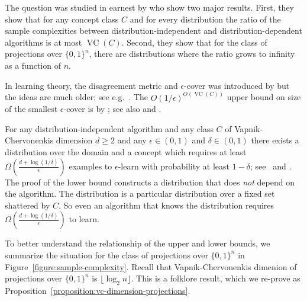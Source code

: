 \documentclass[10pt]{article}
\DeclareMathOperator{\VC}{VC}
\begin{document}
The question was studied in earnest by \cite{Darnstadt-Simon-Szorenyi-2013} who
show two major results. First, they show that for any concept class $C$ and for
every distribution the ratio of the sample complexities between
distribution-independent and distribution-dependent algorithms is at most
$\VC(C)$. Second, they show that for the class of projections over $\{0,1\}^n$,
there are distributions where the ratio grows to infinity as a function of $n$.

In learning theory, the disagreement metric and $\epsilon$-cover was  introduced
by \cite{Benedek-Itai-1991} but the ideas are much older; see
e.g.~\cite{Dudley-1978, Dudley-1984}. The $O(1/\epsilon)^{O(\VC(C))}$ upper
bound on size of the smallest $\epsilon$-cover is by \citet[Lemma
7.13]{Dudley-1978}; see also \citet[Chapter 4]{Devroye-Lugosi-2000} and
\cite{Haussler-1995}.

For any distribution-independent algorithm and any class $C$ of
Vapnik-Chervonenkis dimension $d \ge 2$ and any $\epsilon \in (0,1)$ and $\delta
\in (0,1)$ there exists a distribution over the domain and a concept which
requires at least $\Omega \left(\frac{d + \log(1/\delta)}{\epsilon}\right)$
examples to $\epsilon$-learn with probability at least $1 - \delta$;
see~\cite[Theorem 5.3]{Anthony-Bartlett-1999} and
\cite{Blumer-Ehrenfeucht-Haussler-Warmuth-1989,
Ehrenfeucht-Haussler-Kearns-Valiant-1989}. The proof of the lower bound
constructs a distribution that does \emph{not} depend on the algorithm. The
distribution is a particular distribution over a fixed set shattered by $C$. So
even an algorithm that knows the distribution requires $\Omega \left(\frac{d +
\log(1/\delta)}{\epsilon}\right)$ to learn.

To better understand the relationship of the upper and lower bounds, we
summarize the situation for the class of projections over $\{0,1\}^n$ in
Figure~\ref{figure:sample-complexity}. Recall that Vapnik-Chervonenkis dimenion
of projections over $\{0,1\}^n$ is $\lfloor \log_2 n \rfloor$. This is a
folklore result, which we re-prove as
Proposition~\ref{proposition:vc-dimension-projections}.
\end{document}
